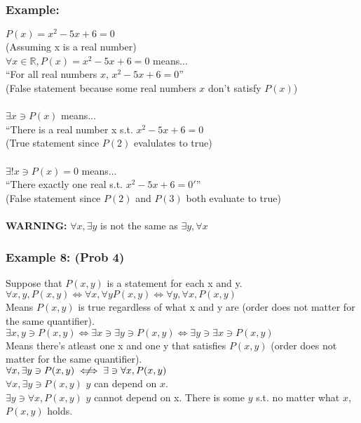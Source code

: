 \documentclass{article}
\newcommand{\notiff}{%
  \mathrel{{\ooalign{\hidewidth$\not\phantom{"}$\hidewidth\cr$\iff$}}}}
\begin{document}
\subsubsection{Example:}
$P(x) = x^2 - 5x + 6 = 0$\\
(Assuming x is a real number)\\
$\forall x \in \mathbb{R}, P(x) = x^2 - 5x + 6 = 0$ means...\\
``For all real numbers $x$, $x^2 - 5x + 6 = 0$''\\
(False statement because some real numbers $x$ don't satisfy $P(x)$)\\\\
$\exists x \ni P(x)$ means...\\
``There is a real number x s.t. $x^2 - 5x + 6 = 0$\\
(True statement since $P(2)$ evalulates to true)\\\\
$\exists ! x \ni P(x) = 0$ means...\\
``There exactly one real s.t. $x^2-5x+6=0'$''\\
(False statement since $P(2)$ and $P(3)$ both evaluate to true)\\\\
\textbf{WARNING:} $\forall x, \exists y$ is not the same as $\exists y, \forall x$
\subsubsection{Example 8: (Prob 4)}
Suppose that $P(x, y)$ is a statement for each x and y.\\
$\forall x, y, P(x, y) \iff \forall x, \forall y P(x, y) \iff \forall y, \forall x, P(x, y)$\\
Means $P(x, y)$ is true regardless of what x and y are (order does not matter for the same quantifier).\\
$\exists x,y \ni P(x,y) \iff \exists x \ni \exists y \ni P(x, y) \iff \exists y \ni \exists x \ni P(x, y)$\\
Means there's atleast one x and one y that satisfies $P(x, y)$ (order does not matter for the same quantifier).\\
$\forall x, \exists y \ni P(x,y) \notiff \exists \ni \forall x, P(x,y)$\\
$\forall x, \exists y \ni P(x, y)$ $y$ can depend on $x$.\\
$\exists y \ni \forall x, P(x, y)$ $y$ cannot depend on x. There is some $y$ s.t. no matter what $x$, $P(x, y)$ holds.
\end{document}
